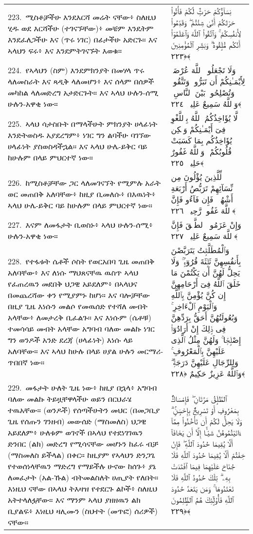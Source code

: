 \documentclass[11pt,a4paper,oneside]{article}%
\newcommand{\mytextarabic}[1]{\textarabic{ #1 \flushright}}
\begin{document}
\begin{longtable}{%
  @{}
    p{}
  @{~~~}
    p{}
    @{}
}
223.\ ሚስቶቻችሁ እንደእርሻ መሬት ናቸው፥ ስለዚህ ሂዱ ወደ እርሻችሁ (ተገናኙቸው)፥ መቼም እንዴትም እንደፈለጋችሁ እና (ጥሩ ነገር) በፊታችሁ አድርጉ። እና ኣላህን ፍሩ፥ እና እንደምትገናኙት እወቁ። &  \mytextarabic{نِسَآؤُكُمْ حَرْثٌۭ لَّكُمْ فَأْتُوا۟ حَرْثَكُمْ أَنَّىٰ شِئْتُمْ ۖ وَقَدِّمُوا۟ لِأَنفُسِكُمْ ۚ وَٱتَّقُوا۟ ٱللَّهَ وَٱعْلَمُوٓا۟ أَنَّكُم مُّلَٟقُوهُ ۗ وَبَشِّرِ ٱلْمُؤْمِنِينَ ﴿٢٢٣﴾}\\
224.\ የኣላህን (ስም) እንደምክንያት በመሃላ ጥሩ ላለመስራት እና ጻዲቅ ላለመሆን፥ እና ሰላም በሰዎች መካከል ላለመድረግ አታድርጉት። እና ኣላህ ሁሉን-ሰሚ ሁሉን-አዋቂ ነው። &  \mytextarabic{وَلَا تَجْعَلُوا۟ ٱللَّهَ عُرْضَةًۭ لِأَيْمَـٰنِكُمْ أَن تَبَرُّوا۟ وَتَتَّقُوا۟ وَتُصْلِحُوا۟ بَيْنَ ٱلنَّاسِ ۗ وَٱللَّهُ سَمِيعٌ عَلِيمٌۭ ﴿٢٢٤﴾}\\
225.\ ኣላህ ሳታስቡት በማላችሁት ምክንያት ሀላፊነት እንድትወስዱ አያደረግም፥ ነገር ግን ልባችሁ ባገኘው ሀላፊነት ያስወስዳችኋል። እና ኣላህ ሁሌ-ይቅር ባይ ከሁሉም በላይ ምህርተኛ ነው።  &  \mytextarabic{لَّا يُؤَاخِذُكُمُ ٱللَّهُ بِٱللَّغْوِ فِىٓ أَيْمَـٰنِكُمْ وَلَٟكِن يُؤَاخِذُكُم بِمَا كَسَبَتْ قُلُوبُكُمْ ۗ وَٱللَّهُ غَفُورٌ حَلِيمٌۭ ﴿٢٢٥﴾}\\
226.\ ከሚስቶቻቸው ጋር ላለመገናኘት የሚምሉ አራት ወር መጠበቅ አለባቸው፥ ከዚያ ቢመለሱ፥ በእዉነት፥ ኣላህ ሁሌ-ይቅር ባይ ከሁሉም በላይ ምህርተኛ ነው። &  \mytextarabic{لِّلَّذِينَ يُؤْلُونَ مِن نِّسَآئِهِمْ تَرَبُّصُ أَرْبَعَةِ أَشْهُرٍۢ ۖ فَإِن فَآءُو فَإِنَّ ٱللَّهَ غَفُورٌۭ رَّحِيمٌۭ ﴿٢٢٦﴾}\\
227.\ እናም ለመፋታት ቢወስኑ፥ ኣላህ ሁሉን-ሰሚ፥ ሁሉን-አዋቂ ነው። &  \mytextarabic{وَإِنْ عَزَمُوا۟ ٱلطَّلَٟقَ فَإِنَّ ٱللَّهَ سَمِيعٌ عَلِيمٌۭ ﴿٢٢٧﴾}\\
228.\ የተፋቱት ሴቶች ሶስት የወርአበባ ጊዜ መጠበቅ አለባቸው፥ እና ለነሱ ማህጸናቸዉ ዉስጥ ኣላህ የፈጠረዉን መደበቅ ህጋዊ አይደለም፥ በኣላህና በመጨረሻው ቀን የሚያምኑ ከሆነ። እና ባሎቻቸው በዚያ ጊዜ እነሱን መልሶ የመዉሰድ የተሻለ መብት አላቸው፥ ለመታረቅ ቢፈልጉ። እና እነሱም (ሴቶቹ) ተመሳሳይ መብት አላቸው አግባብ ባለው መልኩ ነገር ግን ወንዶች አንድ ደረጃ (ሀላፊነት) እነሱ ላይ አለባቸው። እና ኣላህ ከሁሉ በላይ ሀያል ሁሉን መርማሪ-ጥበበኛ ነው። &  \mytextarabic{ وَٱلْمُطَلَّقَٟتُ يَتَرَبَّصْنَ بِأَنفُسِهِنَّ ثَلَٟثَةَ قُرُوٓءٍۢ ۚ وَلَا يَحِلُّ لَهُنَّ أَن يَكْتُمْنَ مَا خَلَقَ ٱللَّهُ فِىٓ أَرْحَامِهِنَّ إِن كُنَّ يُؤْمِنَّ بِٱللَّهِ وَٱلْيَوْمِ ٱلْءَاخِرِ ۚ وَبُعُولَتُهُنَّ أَحَقُّ بِرَدِّهِنَّ فِى ذَٟلِكَ إِنْ أَرَادُوٓا۟ إِصْلَٟحًۭا ۚ وَلَهُنَّ مِثْلُ ٱلَّذِى عَلَيْهِنَّ بِٱلْمَعْرُوفِ ۚ وَلِلرِّجَالِ عَلَيْهِنَّ دَرَجَةٌۭ ۗ وَٱللَّهُ عَزِيزٌ حَكِيمٌ ﴿٢٢٨﴾}\\
229.\ መፋታት ሁለት ጊዜ ነው፥ ከዚያ በኋላ፥ አግባብ ባለው መልኩ ትይዟቸዋላችሁ ወይን በርህራሄ ተዉአቸው። (ወንዶች) የሰጣችሁትን መህር (በመጋቢያ ጊዜ የሰጡን ገንዘብ) መውሰድ (ማስመለስ) ህጋዊ አይደለም፥ ሁለቱም ወገኖች በኣላህ የተደነገገዉን ድንበር (ልክ) መድረግ የሚሳናቸው መሆኑን ከፈሩ ብቻ (ማስመለስ ይችላል) በቀር። ከዚያም የኣላህን ድንጋጌ የተወሰነላቸዉን ማድረግ የማይችሉ ሁኖው ከሰጉ፥ ያኔ ለመፈታት (አል-ኹል) ብትመልስለት ሀጢያት የለበት። እነዚህ ናቸው በኣላህ ትእዛዝ የተደርጉ ልኮች፥ ስለዚህ አትተላለፏቸው። እና ማንም ኣላህ ያዘዘዉን ልክ ቢያልፍ፥ እነዚህ ዛሊሙን (ስህተት (መጥፎ) ሰሪዎች) ናቸው።  &  \mytextarabic{ٱلطَّلَٟقُ مَرَّتَانِ ۖ فَإِمْسَاكٌۢ بِمَعْرُوفٍ أَوْ تَسْرِيحٌۢ بِإِحْسَٟنٍۢ ۗ وَلَا يَحِلُّ لَكُمْ أَن تَأْخُذُوا۟ مِمَّآ ءَاتَيْتُمُوهُنَّ شَيْـًٔا إِلَّآ أَن يَخَافَآ أَلَّا يُقِيمَا حُدُودَ ٱللَّهِ ۖ فَإِنْ خِفْتُمْ أَلَّا يُقِيمَا حُدُودَ ٱللَّهِ فَلَا جُنَاحَ عَلَيْهِمَا فِيمَا ٱفْتَدَتْ بِهِۦ ۗ تِلْكَ حُدُودُ ٱللَّهِ فَلَا تَعْتَدُوهَا ۚ وَمَن يَتَعَدَّ حُدُودَ ٱللَّهِ فَأُو۟لَٟٓئِكَ هُمُ ٱلظَّٟلِمُونَ ﴿٢٢٩﴾}\\

\end{longtable}
\end{document}
